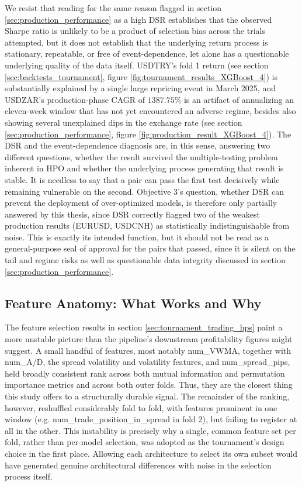 \documentclass[12pt, a4paper]{article}
\begin{document}
\medskip

We resist that reading for the same reason flagged in section \ref{sec:production_performance} as a high DSR establishes that the observed Sharpe ratio is unlikely to be a product of 
selection bias across the trials attempted, but it does not establish that the underlying return process is stationary, repeatable, or free of event-dependence, let alone has a 
questionable underlying quality of the data itself. USDTRY's fold 1 return (see section \ref{sec:backtests_tournament}, figure \ref{fig:tournament_results_XGBoost_4}) is substantially 
explained by a single large repricing event in March 2025, and USDZAR's production-phase CAGR of $1387.75\%$ is an artifact of annualizing an eleven-week window that has not yet 
encountered an adverse regime, besides also showing several unexplained dips in the exchange rate (see section \ref{sec:production_performance}, figure \ref{fig:production_result_XGBoost_4}). 
The DSR and the event-dependence diagnosis are, in this sense, answering two different questions, whether the result survived the 
multiple-testing problem inherent in HPO and whether the underlying process generating that result is stable. It is needless to say that a pair can pass the first test decisively 
while remaining vulnerable on the second. Objective 3's question, whether DSR can prevent the deployment of over-optimized models, is therefore only partially answered by this thesis, 
since DSR correctly flagged two of the weakest production results (EURUSD, USDCNH) as statistically indistinguishable from noise. This is exactly its intended function, but it should 
not be read as a general-purpose seal of approval for the pairs that passed, since it is silent on the tail and regime risks as well as questionable data integrity discussed in 
section \ref{sec:production_performance}.


\subsection{Feature Anatomy: What Works and Why}

The feature selection results in section \ref{sec:tournament_trading_hps} paint a more unstable picture than the pipeline's downstream profitability figures might suggest. A small 
handful of features, most notably num\_VWMA, together with num\_A/D, the spread volatility and volatility features, and num\_spread\_pips, held broadly 
consistent rank across both mutual information and permutation importance metrics and across both outer folds. Thus, they are the closest thing this study offers to a structurally 
durable signal. The remainder of the ranking, however, reshuffled considerably fold to fold, with features prominent in one window (e.g. num\_trade\_position\_in\_spread 
in fold 2), but failing to register at all in the other. This instability is precisely why a single, common feature set per fold, rather than per-model selection, was adopted as the 
tournament's design choice in the first place. Allowing each architecture to select its own subset would have generated genuine architectural differences with noise in the 
selection process itself.
\end{document}
